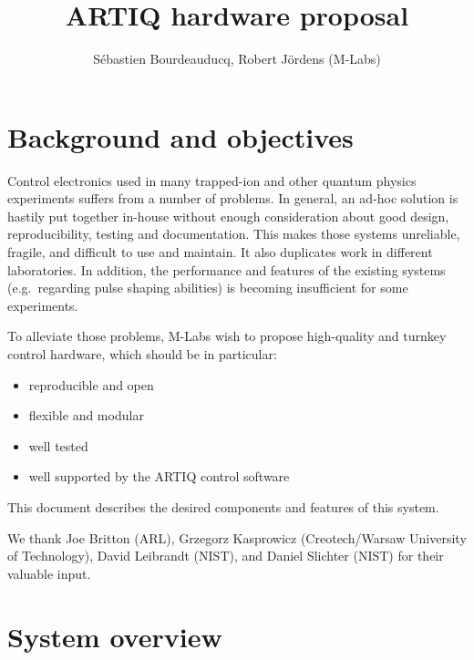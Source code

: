 \documentclass[11pt]{paper}
\begin{document}
\title{ARTIQ hardware proposal}
\author{S\'ebastien Bourdeauducq, Robert J\"ordens (M-Labs)}

\maketitle

\section{Background and objectives}
Control electronics used in many trapped-ion and other quantum physics experiments suffers from a number of problems. In general, an ad-hoc solution is hastily put together in-house without enough consideration about good design, reproducibility, testing and documentation. This makes those systems unreliable, fragile, and difficult to use and maintain. It also duplicates work in different laboratories. In addition, the performance and features of the existing systems (e.g.\ regarding pulse shaping abilities) is becoming insufficient for some experiments.

To alleviate those problems, M-Labs wish to propose high-quality and turnkey control hardware, which should be in particular:
\begin{itemize}
\item reproducible and open
\item flexible and modular
\item well tested
\item well supported by the ARTIQ control software
\end{itemize}

This document describes the desired components and features of this system.

We thank Joe Britton (ARL), Grzegorz Kasprowicz (Creotech/Warsaw University of Technology), David Leibrandt (NIST), and Daniel Slichter (NIST) for their valuable input.

\section{System overview}
\end{document}
